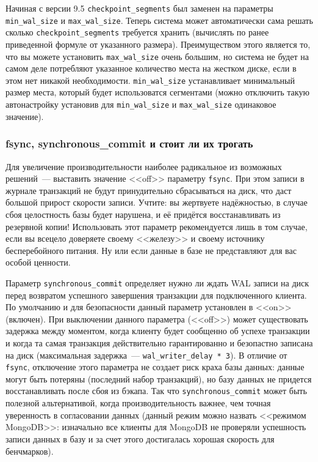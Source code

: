 Начиная с версии 9.5 \lstinline!checkpoint_segments! был заменен на параметры \lstinline!min_wal_size! и \lstinline!max_wal_size!. Теперь система может автоматически сама решать сколько \lstinline!checkpoint_segments! требуется хранить (вычислять по ранее приведенной формуле от указанного размера). Преимуществом этого является то, что вы можете установить \lstinline!max_wal_size! очень большим, но система не будет на самом деле потребляют указанное количество места на жестком диске, если в этом нет никакой необходимости. \lstinline!min_wal_size! устанавливает минимальный размер места, который будет использоватся сегментами (можно отключить такую автонастройку установив для \lstinline!min_wal_size! и \lstinline!max_wal_size! одинаковое значение).


\subsubsection{fsync, synchronous\_commit и стоит ли их трогать}


Для увеличение производительности наиболее радикальное из возможных решений~--- выставить значение <<off>> параметру \lstinline!fsync!. При этом записи в журнале транзакций не будут принудительно сбрасываться на диск, что даст большой прирост скорости записи. Учтите: вы жертвуете надёжностью, в случае сбоя целостность базы будет нарушена, и её придётся восстанавливать из резервной копии! Использовать этот параметр рекомендуется лишь в том случае, если вы всецело доверяете своему <<железу>> и своему источнику бесперебойного питания. Ну или если данные в базе не представляют для вас особой ценности.

Параметр \lstinline!synchronous_commit! определяет нужно ли ждать WAL записи на диск перед возвратом успешного завершения транзакции для подключенного клиента. По умолчанию и для безопасности данный параметр установлен в <<on>> (включен). При выключении данного параметра (<<off>>) может существовать задержка между моментом, когда клиенту будет сообщенно об успехе транзакции и когда та самая транзакция действительно гарантированно и безопастно записана на диск (максимальная задержка~--- \lstinline!wal_writer_delay * 3!). В отличие от \lstinline!fsync!, отключение этого параметра не создает риск краха базы данных: данные могут быть потеряны (последний набор транзакций), но базу данных не придется восстанавливать после сбоя из бэкапа. Так что \lstinline!synchronous_commit! может быть полезной альтернативой, когда производительность важнее, чем точная уверенность в согласовании данных (данный режим можно назвать <<режимом MongoDB>>: изначально все клиенты для MongoDB не проверяли успешность записи данных в базу и за счет этого достигалась хорошая скорость для бенчмарков).



